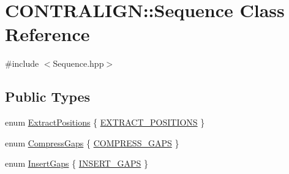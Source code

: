 \hypertarget{class_c_o_n_t_r_a_l_i_g_n_1_1_sequence}{\section{C\+O\+N\+T\+R\+A\+L\+I\+G\+N\+:\+:Sequence Class Reference}
\label{class_c_o_n_t_r_a_l_i_g_n_1_1_sequence}
}


{\ttfamily \#include $<$Sequence.\+hpp$>$}

\subsection*{Public Types}
\begin{DoxyCompactItemize}
\item 
enum \hyperlink{class_c_o_n_t_r_a_l_i_g_n_1_1_sequence_a40ae43ad8766d4ec88647b6446f106f7}{Extract\+Positions} \{ \hyperlink{class_c_o_n_t_r_a_l_i_g_n_1_1_sequence_a40ae43ad8766d4ec88647b6446f106f7a541f3e21010c234909bffe1c4c694fe6}{E\+X\+T\+R\+A\+C\+T\+\_\+\+P\+O\+S\+I\+T\+I\+O\+N\+S}
 \}
\item 
enum \hyperlink{class_c_o_n_t_r_a_l_i_g_n_1_1_sequence_ad5c978f10d584ae0e8460033964162c3}{Compress\+Gaps} \{ \hyperlink{class_c_o_n_t_r_a_l_i_g_n_1_1_sequence_ad5c978f10d584ae0e8460033964162c3af58075360dac5d2e0da7b362c977e9b7}{C\+O\+M\+P\+R\+E\+S\+S\+\_\+\+G\+A\+P\+S}
 \}
\item 
enum \hyperlink{class_c_o_n_t_r_a_l_i_g_n_1_1_sequence_a707b9a9c2a068cbae9f2aaeb3a767e49}{Insert\+Gaps} \{ \hyperlink{class_c_o_n_t_r_a_l_i_g_n_1_1_sequence_a707b9a9c2a068cbae9f2aaeb3a767e49a6ed8ca381acc88db55c9ff4c18bf9daf}{I\+N\+S\+E\+R\+T\+\_\+\+G\+A\+P\+S}
 \}
\end{DoxyCompactItemize}

